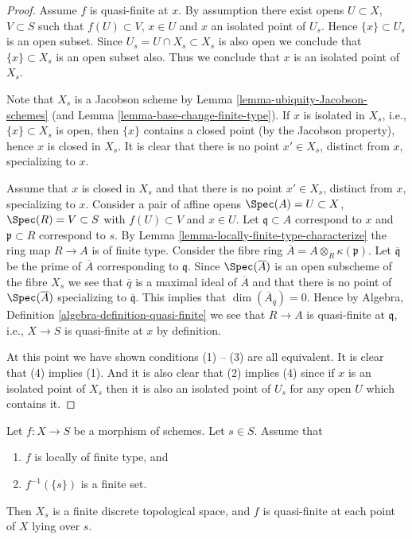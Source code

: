 \begin{proof}
Assume $f$ is quasi-finite at $x$. By assumption there exist opens
$U \subset X$, $V \subset S$ such that $f(U) \subset V$, $x \in U$
and $x$ an isolated point of $U_s$. Hence $\{x\} \subset U_s$ is an open
subset. Since $U_s = U \cap X_s \subset X_s$ is also open we conclude
that $\{x\} \subset X_s$ is an open subset also. Thus we conclude
that $x$ is an isolated point of $X_s$.

\medskip\noindent
Note that $X_s$ is a Jacobson scheme by
Lemma \ref{lemma-ubiquity-Jacobson-schemes}
(and
Lemma \ref{lemma-base-change-finite-type}).
If $x$ is isolated in $X_s$, i.e., $\{x\} \subset X_s$ is open,
then $\{x\}$ contains a closed point (by the Jacobson property), hence
$x$ is closed in $X_s$. It is clear that there is no point $x' \in X_s$,
distinct from $x$, specializing to $x$.

\medskip\noindent
Assume that $x$ is closed in $X_s$ and that there is no point $x' \in X_s$,
distinct from $x$, specializing to $x$. Consider a pair of affine opens
$\Spec(A) = U \subset X$, $\Spec(R) = V \subset S$ with
$f(U) \subset V$ and $x \in U$. Let $\mathfrak q \subset A$ correspond to
$x$ and $\mathfrak p \subset R$ correspond to $s$.
By Lemma \ref{lemma-locally-finite-type-characterize} the ring map
$R \to A$ is of finite type. Consider the fibre ring
$\overline{A} = A \otimes_R \kappa(\mathfrak p)$.
Let $\overline{\mathfrak q}$ be the prime of $\overline{A}$ corresponding
to $\mathfrak q$. Since $\Spec(\overline{A})$ is an open subscheme of
the fibre $X_s$ we see that $\overline{q}$ is a maximal ideal
of $\overline{A}$ and that there is no point of $\Spec(\overline{A})$
specializing to $\overline{\mathfrak q}$.
This implies that $\dim(\overline{A}_{\overline{q}}) = 0$.
Hence by
Algebra, Definition \ref{algebra-definition-quasi-finite}
we see that $R \to A$ is quasi-finite at $\mathfrak q$, i.e.,
$X \to S$ is quasi-finite at $x$ by definition.

\medskip\noindent
At this point we have shown conditions (1) -- (3) are all equivalent.
It is clear that (4) implies (1). And it is also clear that
(2) implies (4) since if $x$ is an isolated point of $X_s$
then it is also an isolated point of $U_s$ for any open $U$
which contains it.
\end{proof}

\begin{lemma}
\label{lemma-finite-fibre}
Let $f : X \to S$ be a morphism of schemes.
Let $s \in S$. Assume that
\begin{enumerate}
\item $f$ is locally of finite type, and
\item $f^{-1}(\{s\})$ is a finite set.
\end{enumerate}
Then $X_s$ is a finite discrete topological space, and
$f$ is quasi-finite at each point of $X$ lying over $s$.
\end{lemma}

